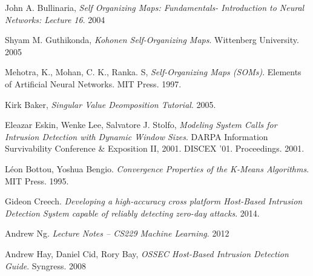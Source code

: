 \documentclass[12pt,a4paper]{report}
\begin{document}
 
\pagebreak
\begin{thebibliography}{9}  

John A. Bullinaria, \emph{Self Organizing Maps: Fundamentals- Introduction to
Neural Networks: Lecture 16}. 2004

Shyam M. Guthikonda, \emph{Kohonen Self-Organizing Maps}. Wittenberg
University. 2005

Mehotra, K., Mohan, C. K., Ranka. S, \emph{Self-Organizing Maps (SOMs)}.
Elements of Artificial Neural Networks. MIT Press. 1997.

Kirk Baker, \emph{Singular Value Deomposition Tutorial}. 2005.

Eleazar Eskin, Wenke Lee, Salvatore J. Stolfo, \emph{Modeling System Calls
for Intrusion Detection with Dynamic Window Sizes}. DARPA Information
Survivability Conference \& Exposition II, 2001. DISCEX '01. Proceedings. 2001.

 Léon Bottou, Yoshua Bengio. \emph{Convergence Properties of the K-Means
 Algorithms}. MIT Press. 1995.
 
Gideon Creech. \emph{Developing a high-accuracy cross platform Host-Based
Intrusion Detection System capable of reliably detecting zero-day attacks}. 
2014.

Andrew Ng. \emph{Lecture Notes – CS229 Machine Learning}. 2012

Andrew Hay, Daniel Cid, Rory Bay, \emph{OSSEC Host-Based Intrusion Detection
Guide}. Syngress. 2008

\end{thebibliography}
\end{document}
